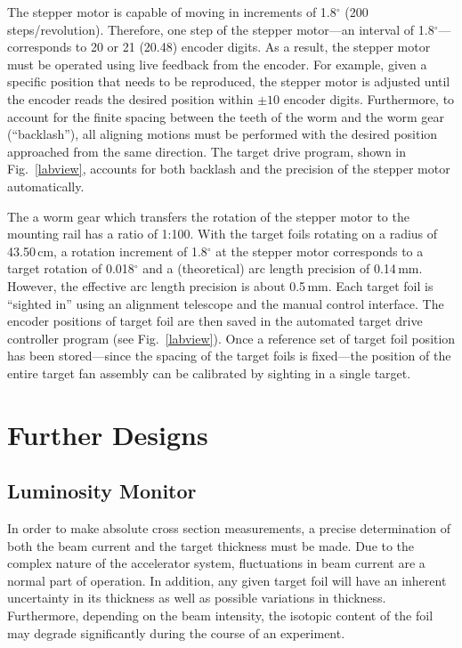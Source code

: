 The stepper motor is capable of moving in increments of 1.8$^\circ$ (200 steps/revolution).  Therefore, one step of the stepper motor---an interval of 1.8$^\circ$---corresponds to 20 or 21 (20.48) encoder digits.  As a result, the stepper motor must be operated using live feedback from the encoder.  For example, given a specific position that needs to be reproduced, the stepper motor is adjusted until the encoder reads the desired position within $\pm 10$ encoder digits.  Furthermore, to account for the finite spacing between the teeth of the worm and the worm gear (``backlash''), all aligning motions must be performed with the desired position approached from the same direction.  The target drive program, shown in Fig.~\ref{labview}, accounts for both backlash and the precision of the stepper motor automatically.

The a worm gear which transfers the rotation of the stepper motor to the mounting rail has a ratio of 1:100.   With the target foils rotating on a radius of 43.50\,cm, a rotation increment of 1.8$^\circ$ at the stepper motor corresponds to a target rotation of 0.018$^\circ$ and a (theoretical) arc length precision of 0.14\,mm.  However, the effective arc length precision is about 0.5\,mm.  Each target foil is ``sighted in'' using an alignment telescope and the manual control interface.  The encoder positions of target foil are then saved in the automated target drive controller program (see Fig.~\ref{labview}).  Once a reference set of target foil position has been stored---since the spacing of the target foils is fixed---the position of the entire target fan assembly can be calibrated by sighting in a single target.

\section{Further Designs}
\subsection{Luminosity Monitor}
In order to make absolute cross section measurements, a precise determination of both the beam current and the target thickness must be made.  Due to the complex nature of the accelerator system, fluctuations in beam current are a normal part of operation.  In addition, any given target foil will have an inherent uncertainty in its thickness as well as possible variations in thickness.  Furthermore, depending on the beam intensity, the isotopic content of the foil may degrade significantly during the course of an experiment.

